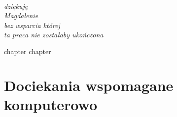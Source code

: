 \documentclass[
  a4paper,
  twoside,
  justified,
  nobib,
  marginals=raggedright,
]{tufte-book}
\begin{document}
\frontmatter
\maketitle

\cleardoublepage
\thispagestyle{empty}
~\vfill
\vfill
\begin{fullwidth}
\raggedleft\noindent\fontsize{16}{26}\selectfont\itshape
\nohyphenation
dziękuję \\
Magdalenie \\
bez wsparcia której \\
ta praca nie zostałaby ukończona
\end{fullwidth}
\vfill

\tableofcontents



\mainmatter

{chapter}
{chapter}

\chapter{Dociekania wspomagane komputerowo}\label{chapter:numeric}
\end{document}
